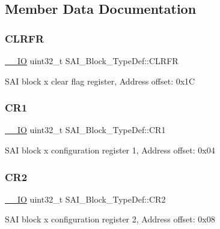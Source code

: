 \subsection{Member Data Documentation}
\mbox{\label{struct_s_a_i___block___type_def_a52dffdfbe572129cc142023f3daeeffe}} 
\subsubsection{\texorpdfstring{CLRFR}{CLRFR}}
{\footnotesize\ttfamily \mbox{\hyperlink{core__sc300_8h_aec43007d9998a0a0e01faede4133d6be}{\+\_\+\+\_\+\+IO}} uint32\+\_\+t S\+A\+I\+\_\+\+Block\+\_\+\+Type\+Def\+::\+C\+L\+R\+FR}

S\+AI block x clear flag register, Address offset\+: 0x1C \mbox{\label{struct_s_a_i___block___type_def_a8935f3f22c733c1cb5a05cecf3cfa38c}} 
\subsubsection{\texorpdfstring{CR1}{CR1}}
{\footnotesize\ttfamily \mbox{\hyperlink{core__sc300_8h_aec43007d9998a0a0e01faede4133d6be}{\+\_\+\+\_\+\+IO}} uint32\+\_\+t S\+A\+I\+\_\+\+Block\+\_\+\+Type\+Def\+::\+C\+R1}

S\+AI block x configuration register 1, Address offset\+: 0x04 \mbox{\label{struct_s_a_i___block___type_def_ad9976416e6199c8c1f7bcdabe20e4bd2}} 
\subsubsection{\texorpdfstring{CR2}{CR2}}
{\footnotesize\ttfamily \mbox{\hyperlink{core__sc300_8h_aec43007d9998a0a0e01faede4133d6be}{\+\_\+\+\_\+\+IO}} uint32\+\_\+t S\+A\+I\+\_\+\+Block\+\_\+\+Type\+Def\+::\+C\+R2}

S\+AI block x configuration register 2, Address offset\+: 0x08 \mbox{\label{struct_s_a_i___block___type_def_a9217ce4fb1e7e16dc0ead8523a6c045a}} 
